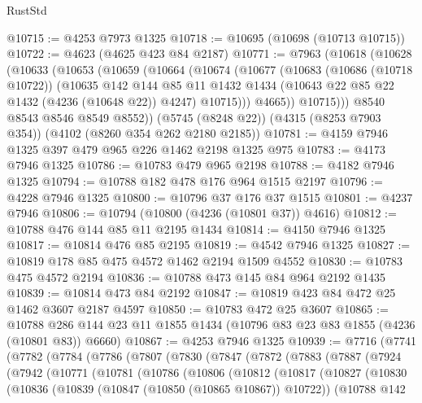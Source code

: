 \begin{lexlean}{RustStd}
\begin{coremodule}
@10715 := @4253 @7973 @1325
@10718 := @10695 (@10698 (@10713 @10715))
@10722 := @4623 (@4625 @423 @84 @2187)
@10771 := @7963
    (@10618
      (@10628
        (@10633
          (@10653
            (@10659
              (@10664
                (@10674
                  (@10677
                    (@10683
                      (@10686 (@10718 @10722))
                      (@10635
                        @142
                        @144
                        @85
                        @11
                        @1432
                        @1434
                        (@10643 @22 @85 @22 @1432 (@4236 (@10648 @22)) @4247)
                        @10715)))
                  @4665))
              @10715)))
        @8540
        @8543
        @8546
        @8549
        @8552))
    (@5745 (@8248 @22))
    (@4315 (@8253 @7903 @354))
    (@4102 (@8260 @354 @262 @2180 @2185))
@10781 := @4159 @7946 @1325 @397 @479 @965 @226 @1462 @2198 @1325 @975
@10783 := @4173 @7946 @1325
@10786 := @10783 @479 @965 @2198
@10788 := @4182 @7946 @1325
@10794 := @10788 @182 @478 @176 @964 @1515 @2197
@10796 := @4228 @7946 @1325
@10800 := @10796 @37 @176 @37 @1515
@10801 := @4237 @7946
@10806 := @10794 (@10800 (@4236 (@10801 @37)) @4616)
@10812 := @10788 @476 @144 @85 @11 @2195 @1434
@10814 := @4150 @7946 @1325
@10817 := @10814 @476 @85 @2195
@10819 := @4542 @7946 @1325
@10827 := @10819 @178 @85 @475 @4572 @1462 @2194 @1509 @4552
@10830 := @10783 @475 @4572 @2194
@10836 := @10788 @473 @145 @84 @964 @2192 @1435
@10839 := @10814 @473 @84 @2192
@10847 := @10819 @423 @84 @472 @25 @1462 @3607 @2187 @4597
@10850 := @10783 @472 @25 @3607
@10865 := @10788 @286 @144 @23 @11 @1855 @1434 (@10796 @83 @23 @83 @1855 (@4236 (@10801 @83)) @6660)
@10867 := @4253 @7946 @1325
@10939 := @7716
    (@7741
      (@7782
        (@7784
          (@7786
            (@7807
              (@7830
                (@7847
                  (@7872
                    (@7883
                      (@7887
                        (@7924
                          (@7942
                            (@10771
                              (@10781
                                (@10786
                                  (@10806
                                    (@10812
                                      (@10817
                                        (@10827
                                          (@10830
                                            (@10836
                                              (@10839 (@10847 (@10850 (@10865 @10867)) @10722))
                                              (@10788
                                                @142

\end{coremodule}
\end{lexlean}
